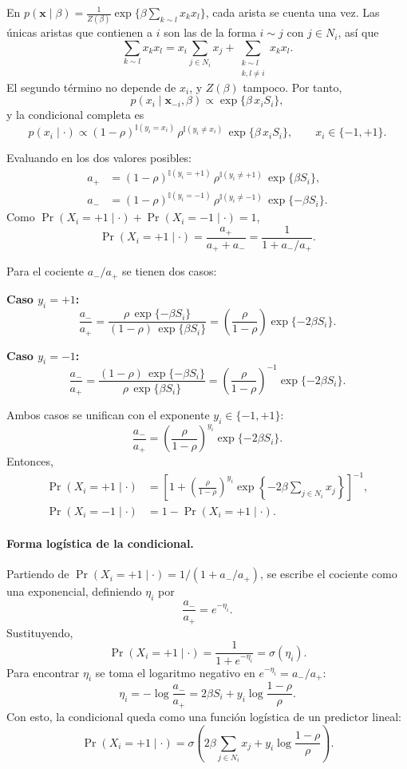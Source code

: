 \documentclass[11pt,a4paper]{article}
\begin{document}
En $p(\boldsymbol{x}\mid\beta) = \frac{1}{Z(\beta)}\exp\{\beta \sum_{k \sim l} x_k x_l\}$, cada arista se cuenta una vez. Las únicas aristas que contienen a $i$ son las de la forma $i \sim j$ con $j\in N_i$, así que
\[
\sum_{k \sim l} x_k x_l = x_i \sum_{j \in N_i} x_j + \sum_{\substack{k \sim l \\ k,l \neq i}} x_k x_l.
\]
El segundo término no depende de $x_i$, y $Z(\beta)$ tampoco. Por tanto,
\[
p(x_i \mid \boldsymbol{x}_{-i}, \beta) \propto \exp\{\beta\, x_i S_i\},
\]
y la condicional completa es
\[
p(x_i \mid \cdot) \propto (1-\rho)^{\mathbb{I}(y_i = x_i)}\, \rho^{\mathbb{I}(y_i \neq x_i)}\, \exp\{\beta\, x_i S_i\}, \qquad x_i \in \{-1,+1\}.
\]

Evaluando en los dos valores posibles:
\begin{align*}
a_+ &= (1-\rho)^{\mathbb{I}(y_i = +1)}\, \rho^{\mathbb{I}(y_i \neq +1)}\, \exp\{\beta S_i\}, \\
a_- &= (1-\rho)^{\mathbb{I}(y_i = -1)}\, \rho^{\mathbb{I}(y_i \neq -1)}\, \exp\{-\beta S_i\}.
\end{align*}
Como $\Pr(X_i = +1 \mid \cdot) + \Pr(X_i = -1 \mid \cdot) = 1$,
\[
\Pr(X_i = +1 \mid \cdot) = \frac{a_+}{a_+ + a_-} = \frac{1}{1 + a_-/a_+}.
\]

Para el cociente $a_-/a_+$ se tienen dos casos:

\textbf{Caso $y_i = +1$:}
\[
\frac{a_-}{a_+} = \frac{\rho\, \exp\{-\beta S_i\}}{(1-\rho)\, \exp\{\beta S_i\}} = \left(\frac{\rho}{1-\rho}\right) \exp\{-2\beta S_i\}.
\]

\textbf{Caso $y_i = -1$:}
\[
\frac{a_-}{a_+} = \frac{(1-\rho)\, \exp\{-\beta S_i\}}{\rho\, \exp\{\beta S_i\}} = \left(\frac{\rho}{1-\rho}\right)^{-1} \exp\{-2\beta S_i\}.
\]

Ambos casos se unifican con el exponente $y_i \in \{-1,+1\}$:
\[
\frac{a_-}{a_+} = \left(\frac{\rho}{1-\rho}\right)^{y_i} \exp\{-2\beta S_i\}.
\]
Entonces,
\[
\boxed{
\begin{aligned}
\Pr(X_i = +1 \mid \cdot) &= \left[ 1 + \left(\frac{\rho}{1-\rho}\right)^{y_i} \exp\left\{-2\beta \sum_{j \in N_i} x_j\right\} \right]^{-1}, \\[0.8em]
\Pr(X_i = -1 \mid \cdot) &= 1 - \Pr(X_i = +1 \mid \cdot).
\end{aligned}
}
\]

\paragraph{Forma logística de la condicional.}
Partiendo de $\Pr(X_i = +1 \mid \cdot) = 1/(1 + a_-/a_+)$, se escribe el cociente como una exponencial, definiendo $\eta_i$ por
\[
\frac{a_-}{a_+} = e^{-\eta_i}.
\]
Sustituyendo,
\[
\Pr(X_i = +1 \mid \cdot) = \frac{1}{1 + e^{-\eta_i}} = \sigma(\eta_i).
\]
Para encontrar $\eta_i$ se toma el logaritmo negativo en $e^{-\eta_i} = a_-/a_+$:
\[
\eta_i = -\log\frac{a_-}{a_+} = 2\beta S_i + y_i \log\frac{1-\rho}{\rho}.
\]
Con esto, la condicional queda como una función logística de un predictor lineal:
\[
\Pr(X_i = +1 \mid \cdot) = \sigma\!\left(2\beta \sum_{j\in N_i} x_j + y_i \log\frac{1-\rho}{\rho}\right).
\]
\end{document}
